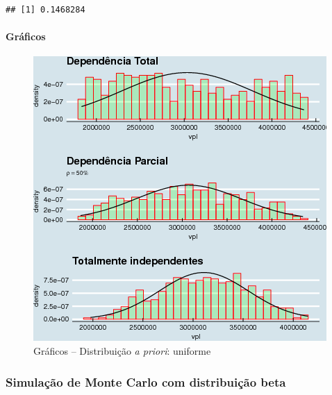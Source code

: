 \documentclass[a4paper]{article}
\newenvironment{Shaded}{\begin{snugshade}}{\end{snugshade}}
\newcommand{\KeywordTok}[1]{\textcolor[rgb]{0.13,0.29,0.53}{\textbf{#1}}}
\newcommand{\DataTypeTok}[1]{\textcolor[rgb]{0.13,0.29,0.53}{#1}}
\newcommand{\FloatTok}[1]{\textcolor[rgb]{0.00,0.00,0.81}{#1}}
\newcommand{\OperatorTok}[1]{\textcolor[rgb]{0.81,0.36,0.00}{\textbf{#1}}}
\newcommand{\NormalTok}[1]{#1}
\let\oldparagraph\paragraph
\renewcommand{\paragraph}[1]{\oldparagraph{#1}\mbox{}}
\begin{document}
\begin{Shaded}
\end{Shaded}

\begin{verbatim}
## [1] 0.1468284
\end{verbatim}

\paragraph{Gráficos}\label{graficos}

\begin{figure}[H]

{\centering \includegraphics[width=0.7\linewidth]{images/histogramasuniforme-1} 

}

\caption{Gráficos -- Distribuição \emph{a priori}: uniforme}\label{fig:histogramasuniforme}
\end{figure}

\subsubsection{Simulação de Monte Carlo com distribuição
beta}\label{simulacao-de-monte-carlo-com-distribuicao-beta}
\end{document}
